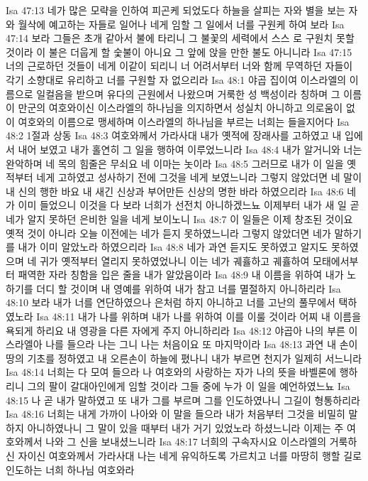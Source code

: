 Isa 47:13  네가 많은 모략을 인하여 피곤케 되었도다 하늘을 살피는 자와 별을 보는 자와 월삭에 예고하는 자들로 일어나 네게 임할 그 일에서 너를 구원케 하여 보라
Isa 47:14  보라 그들은 초개 같아서 불에 타리니 그 불꽃의 세력에서 스스 로 구원치 못할 것이라 이 불은 더웁게 할 숯불이 아니요 그 앞에 앉을 만한 불도 아니니라
Isa 47:15  너의 근로하던 것들이 네게 이같이 되리니 너 어려서부터 너와 함께 무역하던 자들이 각기 소향대로 유리하고 너를 구원할 자 없으리라
Isa 48:1  야곱 집이여 이스라엘의 이름으로 일컬음을 받으며 유다의 근원에서 나왔으며 거룩한 성 백성이라 칭하며 그 이름이 만군의 여호와이신 이스라엘의 하나님을 의지하면서 성실치 아니하고 의로움이 없이 여호와의 이름으로 맹세하며 이스라엘의 하나님을 부르는 너희는 들을지어다
Isa 48:2  1절과 상동
Isa 48:3  여호와께서 가라사대 내가 옛적에 장래사를 고하였고 내 입에서 내어 보였고 내가 홀연히 그 일을 행하여 이루었느니라
Isa 48:4  내가 알거니와 너는 완악하며 네 목의 힘줄은 무쇠요 네 이마는 놋이라
Isa 48:5  그러므로 내가 이 일을 옛적부터 네게 고하였고 성사하기 전에 그것을 네게 보였느니라 그렇지 않았더면 네 말이 내 신의 행한 바요 내 새긴 신상과 부어만든 신상의 명한 바라 하였으리라
Isa 48:6  네가 이미 들었으니 이것을 다 보라 너희가 선전치 아니하겠느뇨 이제부터 내가 새 일 곧 네가 알지 못하던 은비한 일을 네게 보이노니
Isa 48:7  이 일들은 이제 창조된 것이요 옛적 것이 아니라 오늘 이전에는 네가 듣지 못하였느니라 그렇지 않았더면 네가 말하기를 내가 이미 알았노라 하였으리라
Isa 48:8  네가 과연 듣지도 못하였고 알지도 못하였으며 네 귀가 옛적부터 열리지 못하였었나니 이는 네가 궤휼하고 궤휼하여 모태에서부터 패역한 자라 칭함을 입은 줄을 내가 알았음이라
Isa 48:9  내 이름을 위하여 내가 노하기를 더디 할 것이며 내 영예를 위하여 내가 참고 너를 멸절하지 아니하리라
Isa 48:10  보라 내가 너를 연단하였으나 은처럼 하지 아니하고 너를 고난의 풀무에서 택하였노라
Isa 48:11  내가 나를 위하며 내가 나를 위하여 이를 이룰 것이라 어찌 내 이름을 욕되게 하리요 내 영광을 다른 자에게 주지 아니하리라
Isa 48:12  야곱아 나의 부른 이스라엘아 나를 들으라 나는 그니 나는 처음이요 또 마지막이라
Isa 48:13  과연 내 손이 땅의 기초를 정하였고 내 오른손이 하늘에 폈나니 내가 부르면 천지가 일제히 서느니라
Isa 48:14  너희는 다 모여 들으라 나 여호와의 사랑하는 자가 나의 뜻을 바벨론에 행하리니 그의 팔이 갈대아인에게 임할 것이라 그들 중에 누가 이 일을 예언하였느뇨
Isa 48:15  나 곧 내가 말하였고 또 내가 그를 부르며 그를 인도하였나니 그길이 형통하리라
Isa 48:16  너희는 내게 가까이 나아와 이 말을 들으라 내가 처음부터 그것을 비밀히 말하지 아니하였나니 그 말이 있을 때부터 내가 거기 있었노라 하셨느니라 이제는 주 여호와께서 나와 그 신을 보내셨느니라
Isa 48:17  너희의 구속자시요 이스라엘의 거룩하신 자이신 여호와께서 가라사대 나는 네게 유익하도록 가르치고 너를 마땅히 행할 길로 인도하는 너희 하나님 여호와라
